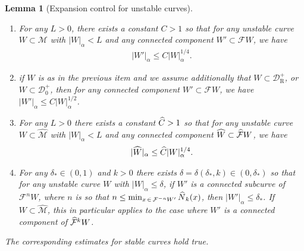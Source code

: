 \documentclass[10pt]{amsart}
\newtheorem{lemm}[theo]{Lemma}\newtheorem{prop}[theo]{Proposition}\newtheorem{coro}[theo]{Corollary}\newtheorem{conj}[theo]{Conjecture}
\theoremstyle{definition}\newtheorem{defi}[theo]{Definition}\newtheorem{rema}[theo]{Remark}\newtheorem{exam}[theo]{Example}\newtheorem{exem}[theo]{Example}\newtheorem{nota}[theo]{Notation}
\newcommand{\cm}{\mathcal{F}}
\newcommand{\cell}{\mathcal{D}}
\newcommand{\csp}{\mathcal{M}}
\newcommand{\cmp}{\hat\cm}
\newcommand{\cspi}{\widehat{\csp}}
\newcommand{\recoPrivate}{\mathrm{R}}
\newcommand{\backReco}{{\cell^+_{\recoPrivate}}}
\newcommand{\adm}{_{\alpha^{+}}}
\newcommand{\Np}{\hat N}
\renewcommand{\adm}{_{\alpha}}
\newcommand*{\relabel}{\renewcommand{\labelenumi}{(\theenumi)}}
\newcommand*{\alphenumi}{\renewcommand*{\theenumi}{\alph{enumi}}\relabel}
\let\oldhat\hat
\renewcommand*{\hat}[1]{\mathchoice{\widehat{#1}}{\widehat{#1}}{\oldhat{#1}}{\oldhat{#1}}}
\begin{document}
\begin{lemm}[Expansion control for unstable curves]\label{l_globalExpansion}
\leavevmode
\begin{enumerate}\alphenumi
\item\label{lemm4.25.1} For any $L > 0$, there exists a constant $C > 1$ so that for any unstable curve $W\subset\csp$ with $|W|\adm < L$ and any connected component $W'\subset \cm W$, we have
\begin{align}\label{e_globalExpansion}
|W'|\adm\le C|W|\adm^{1/4}.
\end{align}
\item\label{lemm4.25.2} if $W$ is as in the previous item and we assume additionally that $W\subset\backReco$, or $W\subset \cell_{0}^{+}$, then for any connected component $W'\subset\cm W$, we have $|W'|\adm \le C|W|\adm^{1/2}$.

\item\label{lemm4.25.3} For any $L > 0$ there exists a constant $\hat C > 1$ so that for any unstable curve $W\subset\cspi$ with $|W|\adm < L$ and any connected component $\hat W\subset \cmp W$, we have
\begin{align*}
|\hat W|\adm \le \hat C|W|\adm^{1/4}.
\end{align*}
\item\label{lemm4.25.4} For any $\delta_{*} \in(0,1)$ and $k > 0$ there exists $\delta =\delta(\delta_{*}, k)\in(0,\delta_{*})$ so that for any unstable curve $W$ with $|W|\adm\le \delta$, if $W'$ is a connected subcurve of $\cm^{n}W$, where $n$ is so that $n\le\min_{x\,\in\,\cm^{-n}W'}\Np_{k}(x)$, then $|W'|\adm\le \delta_*$. If $W\subset\cspi$, this in particular applies to the case where $W'$ is a connected component of $\cmp^{k}W$.
\end{enumerate}
The corresponding estimates for stable curves hold true.
\end{lemm}
\end{document}
